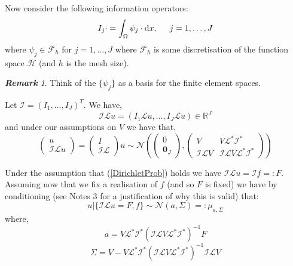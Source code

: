 \documentclass{article}
\theoremstyle{definition}
\theoremstyle{remark}
\newtheorem*{remark}{\textbf{Remark}}  %
\begin{document}
Now consider the following information operators:
\begin{equation*}
    I_{j}\cdot=\int_{\Omega}\psi_{j}\cdot\mathrm{d}x, \hspace{0.5cm} j=1,\dots,J
\end{equation*}
where $\psi_{j}\in\mathcal{F}_{h}$ for $j=1,\dots,J$ where $\mathcal{F}_{h}$ is some discretisation of the function space $\mathcal{H}$ (and $h$ is the mesh size).
\begin{remark}
Think of the $\{\psi_{j}\}$ as a basis for the finite element spaces.
\end{remark}

Let $\mathcal{I}=(I_1,\dots,I_J)^T$. We have,
\begin{equation*}
    \mathcal{I}\mathcal{L}u=(I_{1}\mathcal{L}u,\dots,I_{J}\mathcal{L}u)\in\mathbb{R}^{J}
\end{equation*}
and under our assumptions on $V$ we have that,
\begin{equation}
    \label{jointInfoDist}
    \begin{pmatrix}
    u \\
    \mathcal{I}\mathcal{L}u
    \end{pmatrix} =
    \begin{pmatrix}
    I \\ \mathcal{I}\mathcal{L}
    \end{pmatrix} u \sim \mathcal{N}\left(
    \begin{pmatrix}
    0 \\
    \mathbf{0}_J
    \end{pmatrix},
    \begin{pmatrix}
    V & V\mathcal{L}^{*}\mathcal{I}^{*} \\
    \mathcal{I}\mathcal{L}V & \mathcal{I}\mathcal{L}V\mathcal{L}^{*}\mathcal{I}^{*}
    \end{pmatrix}
    \right)
\end{equation}

Under the assumption that (\ref{DirichletProb}) holds we have $\mathcal{I}\mathcal{L}u=\mathcal{I}f=:F$. Assuming now that we fix a realisation of $f$ (and so $F$ is fixed) we have by conditioning (see Notes 3 for a justification of why this is valid) that:
\begin{equation}
    \label{conditionalDistnFixed_f}
    u|\{\mathcal{I}\mathcal{L}u=F,f\}\sim\mathcal{N}(a,\Sigma)=:\mu_{a,\Sigma}
\end{equation}
where,
\begin{equation}
    \label{post_mean_before_averaging}
    a = V\mathcal{L}^{*}\mathcal{I}^{*}(\mathcal{I}\mathcal{L}V\mathcal{L}^{*}\mathcal{I}^{*})^{-1}F
\end{equation}
\begin{equation}
    \label{post_var_before_averaging}
    \Sigma = V - V\mathcal{L}^{*}\mathcal{I}^{*}(\mathcal{I}\mathcal{L}V\mathcal{L}^{*}\mathcal{I}^{*})^{-1}\mathcal{I}\mathcal{L}V
\end{equation}
\end{document}
